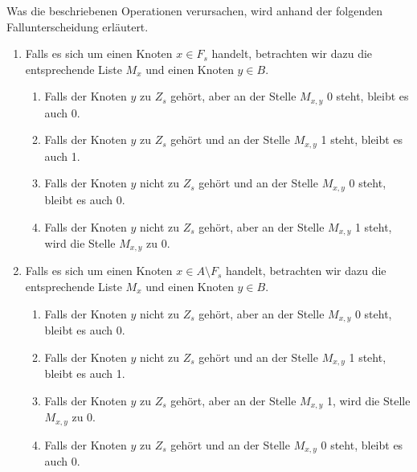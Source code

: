 Was die beschriebenen Operationen verursachen, wird anhand der folgenden Fallunterscheidung erläutert.
\begin{enumerate}
  \item Falls es sich um einen Knoten $x \in F_s$ handelt, betrachten wir dazu die entsprechende
  Liste $M_x$ und einen Knoten $y \in B$.
  \begin{enumerate}
   \item Falls der Knoten $y$ zu $Z_s$ gehört, aber an der Stelle $M_{x,y}$ 0 steht, bleibt es auch 0.
   \item Falls der Knoten $y$ zu $Z_s$ gehört und an der Stelle $M_{x,y}$ 1 steht, bleibt es auch 1.
   \item Falls der Knoten $y$ nicht zu $Z_s$ gehört und an der Stelle $M_{x,y}$ 0 steht, bleibt es auch 0.
   \item Falls der Knoten $y$ nicht zu $Z_s$  gehört, aber an der Stelle $M_{x,y}$ 1 steht, 
    wird die Stelle $M_{x,y}$ zu 0.
  \end{enumerate}
  \item Falls es sich um einen Knoten $x \in A \setminus F_s$ handelt, betrachten wir dazu die entsprechende
  Liste $M_x$ und einen Knoten $y \in B$.
  \begin{enumerate}
    \item Falls der Knoten $y$ nicht zu $Z_s$ gehört, aber an der Stelle $M_{x,y}$ 0 steht, bleibt es auch 0.
    \item Falls der Knoten $y$ nicht zu $Z_s$ gehört und an der Stelle $M_{x,y}$ 1 steht, bleibt es auch 1.
    \item Falls der Knoten $y$ zu $Z_s$ gehört, aber an der Stelle $M_{x,y}$ 1, 
      wird die Stelle $M_{x,y}$ zu 0.
    \item Falls der Knoten $y$ zu $Z_s$ gehört und an der Stelle $M_{x,y}$ 0 steht, bleibt es auch 0.
  \end{enumerate}
\end{enumerate}



